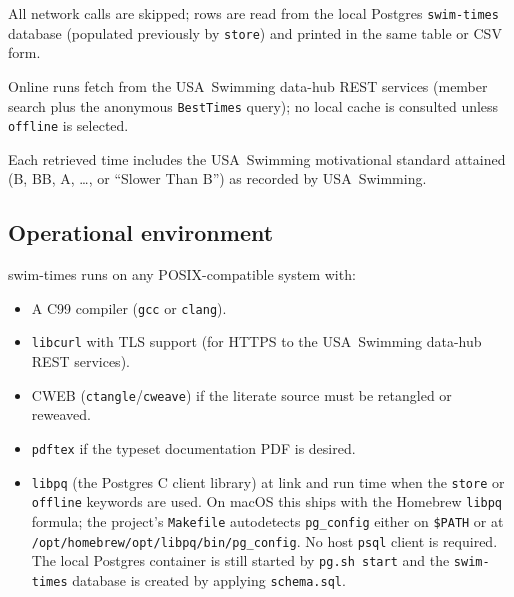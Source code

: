 \documentclass[12pt]{article}
\newcommand{\code}[1]{\texttt{#1}}
\begin{document}
\begin{description}[style=nextline]
  \item[Offline retrieval (\code{offline} keyword).]
        All network calls are skipped; rows are read from the local
        Postgres \texttt{swim-times} database (populated previously
        by \code{store}) and printed in the same table or CSV form.

  \item[Live authoritative data.]
        Online runs fetch from the USA~Swimming data-hub REST
        services (member search plus the anonymous
        \code{BestTimes} query); no local cache is consulted unless
        \code{offline} is selected.

  \item[Motivational standard annotation.]
        Each retrieved time includes the USA~Swimming motivational
        standard attained (B, BB, A, \ldots, or ``Slower Than B'')
        as recorded by USA~Swimming.
\end{description}

\subsection{Operational environment}

swim-times runs on any POSIX-compatible system with:

\begin{itemize}
  \item A C99 compiler (\code{gcc} or \code{clang}).
  \item \code{libcurl} with TLS support (for HTTPS to the
        USA~Swimming data-hub REST services).
  \item CWEB (\code{ctangle}/\code{cweave}) if the literate source
        must be retangled or reweaved.
  \item \code{pdftex} if the typeset documentation PDF is desired.
  \item \texttt{libpq} (the Postgres C client library) at link and
        run time when the \code{store} or \code{offline} keywords
        are used.  On macOS this ships with the Homebrew
        \texttt{libpq} formula; the project's \texttt{Makefile}
        autodetects \texttt{pg\_config} either on \texttt{\$PATH}
        or at \texttt{/opt/homebrew/opt/libpq/bin/pg\_config}.  No
        host \texttt{psql} client is required.  The local Postgres
        container is still started by \texttt{pg.sh start} and the
        \texttt{swim-times} database is created by applying
        \texttt{schema.sql}.
\end{itemize}
\end{document}
